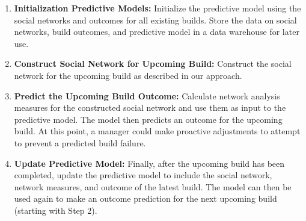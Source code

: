 \documentclass[12pt,oneside]{book}
\begin{document}
% 




\begin{enumerate}
\item \textbf{Initialization Predictive Models:}
Initialize the predictive model using the social networks and
outcomes for all existing builds. Store the data on social networks, build
outcomes, and predictive model in a data warehouse for later use.
\item \textbf{Construct Social Network for Upcoming Build:}
Construct the social network for the upcoming build as described
in our approach.
\item \textbf{Predict the Upcoming Build Outcome:}
Calculate network analysis measures for the constructed social
network and use them as input to the predictive model. The model then predicts
an outcome for the upcoming build. At this point, a manager could make
proactive adjustments to attempt to prevent a predicted build failure.
\item \textbf{Update Predictive Model:}
Finally, after the upcoming build has been completed, update the predictive
model to include the social network, network measures, and outcome of the latest
build. The model can then be used again to make an outcome prediction for the
next upcoming build (starting with Step 2).
\end{enumerate}


\end{document}
